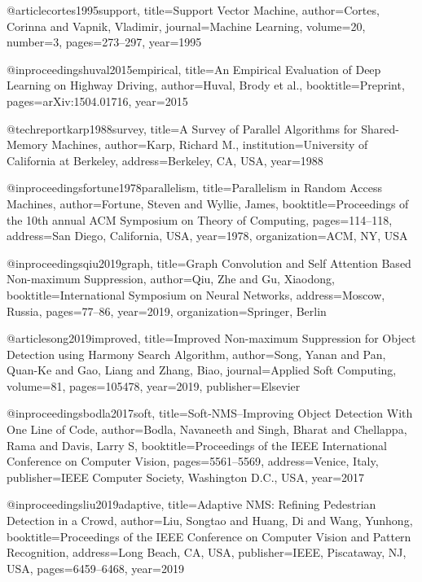 @article{cortes1995support,
  title={{{Support Vector Machine}}},
  author={Cortes, Corinna and Vapnik, Vladimir},
  journal={{Machine Learning}},
  volume={20},
  number={3},
  pages={273--297},
  year={1995}
}

@inproceedings{huval2015empirical,
  title={{{An Empirical Evaluation of Deep Learning on Highway Driving}}},
  author={{Huval, Brody et al.}},
  booktitle={Preprint},
  pages={arXiv:1504.01716},
  year={2015}
}

@techreport{karp1988survey,
  title={{{A Survey of Parallel Algorithms for Shared-Memory Machines}}},
  author={Karp, Richard M.},
  institution={University of California at Berkeley},
  address={Berkeley, CA, USA},
  year={1988}
}

@inproceedings{fortune1978parallelism,
  title={{{Parallelism in Random Access Machines}}},
  author={Fortune, Steven and Wyllie, James},
  booktitle={Proceedings of the 10th annual ACM Symposium on Theory of Computing},
  pages={114--118},
  address={San Diego, California, USA},
  year={1978},
  organization={ACM, NY, USA}
}

@inproceedings{qiu2019graph,
  title={{{Graph Convolution and Self Attention Based Non-maximum Suppression}}},
  author={Qiu, Zhe and Gu, Xiaodong},
  booktitle={{International Symposium on Neural Networks}},
  address={Moscow, Russia},
  pages={77--86},
  year={2019},
  organization={Springer, Berlin}
}

@article{song2019improved,
  title={{{Improved Non-maximum Suppression for Object Detection using Harmony Search Algorithm}}},
  author={Song, Yanan and Pan, Quan-Ke and Gao, Liang and Zhang, Biao},
  journal={{Applied Soft Computing}},
  volume={81},
  pages={105478},
  year={2019},
  publisher={Elsevier}
}

@inproceedings{bodla2017soft,
  title={{{Soft-NMS--Improving Object Detection With One Line of Code}}},
  author={Bodla, Navaneeth and Singh, Bharat and Chellappa, Rama and Davis, Larry S},
  booktitle={{Proceedings of the IEEE International Conference on Computer Vision}},
  pages={5561--5569},
  address={Venice, Italy},
  publisher={IEEE Computer Society, Washington D.C., USA},
  year={2017}
}

@inproceedings{liu2019adaptive,
  title={{{Adaptive NMS: Refining Pedestrian Detection in a Crowd}}},
  author={Liu, Songtao and Huang, Di and Wang, Yunhong},
  booktitle={{Proceedings of the IEEE Conference on Computer Vision and Pattern Recognition}},
  address={Long Beach, CA, USA},
  publisher={IEEE, Piscataway, NJ, USA},
  pages={6459--6468},
  year={2019}
}

